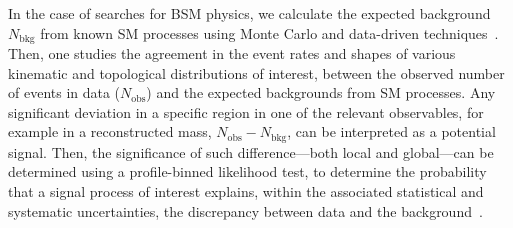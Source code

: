 In the case of searches for BSM physics, we calculate the expected background $N_\text{bkg}$ from known SM processes using Monte Carlo and data-driven techniques~\cite{Alwall:2014hca,Cacciari:2011ma}. Then, one studies the agreement in the event rates and shapes of various kinematic and topological distributions of interest, between the observed number of events in data ($N_\text{obs}$) and the expected backgrounds from SM processes. Any significant deviation in a specific region in one of the relevant observables, for example in a reconstructed mass, $N_\text{obs} - N_\text{bkg}$, can be interpreted as a potential signal. Then, the significance of such difference—both local and global—can be determined using a profile-binned likelihood test, to determine the probability that a signal process of interest explains, within the associated statistical and systematic uncertainties, the discrepancy between data and the background~\cite{Read:2002,Rolke:2005,FeldmanCousins:1998,Segura:2024srj}. 



